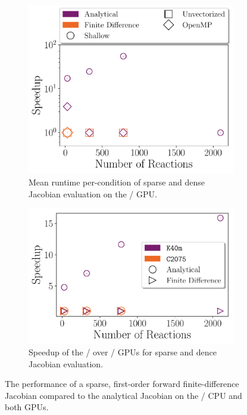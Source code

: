 \documentclass[12pt,number,sort&compress,preprint]{elsarticle}
\begin{document}
\begin{figure}[htbp]
   \centering
  \begin{subfigure}[t]{0.48\linewidth}
      \includegraphics[width=\textwidth]{finite_difference_vs_analytical.pdf}
      \caption{Mean runtime per-condition of sparse and dense Jacobian evaluation on the \gpunew/ GPU.}
      \label{F:fd_vs_analytical_cpu}
  \end{subfigure}
  \hfill
  \begin{subfigure}[t]{0.48\linewidth}
      \includegraphics[width=\textwidth]{finite_difference_vs_analytical_gpu.pdf}
      \caption{Speedup of the \gpunew/ over \gpuold/ GPUs for sparse and dence Jacobian evaluation.}
      \label{F:fd_vs_analytical_gpu}
  \end{subfigure}
  \caption{The performance of a sparse, first-order forward finite-difference Jacobian compared to the analytical Jacobian on the \avx/ CPU and both GPUs.}
  \label{F:fd_vs_analytical}
\end{figure}
\end{document}
